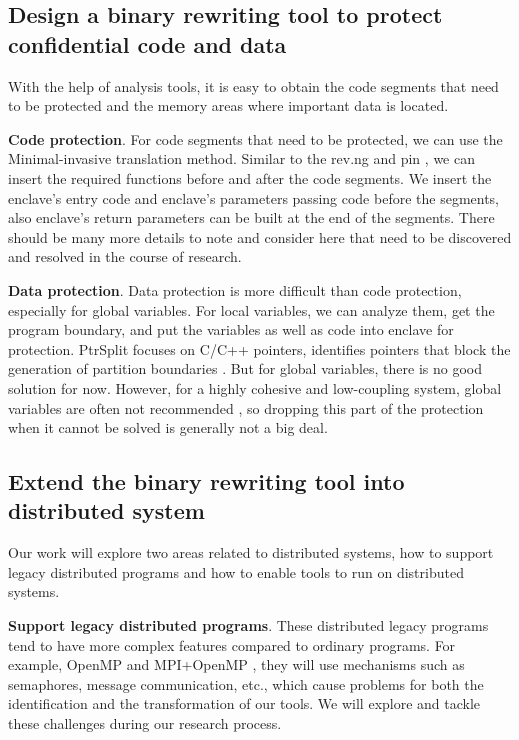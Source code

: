 \subsection{Design a binary rewriting tool to protect confidential code and data}
With the help of analysis tools, it is easy to obtain the code segments that need
to be protected and the memory areas where important data is located.

\textbf{Code protection}. For code segments that need to be protected,
we can use the Minimal-invasive translation method. Similar to the rev.ng \cite{Federico2017revngAU}
and pin \cite{Luk2005PinBC}, we can insert the required functions before and
after the code segments. We insert the enclave's entry code and enclave's parameters passing code
before the segments, also enclave's return parameters can be built at the end of the segments.
There should be many more details to note and consider here that need to be
discovered and resolved in the course of research.

\textbf{Data protection}. Data protection is more difficult than code protection,
especially for global variables.
For local variables, we can analyze them, get the program boundary,
and put the variables as well as code into enclave for protection.
PtrSplit focuses on C/C++ pointers, identifies pointers that block
the generation of partition boundaries \cite{Liu2017PtrSplitSG}.
But for global variables, there is no good solution for now. However,
for a highly cohesive and low-coupling system, global variables are often not recommended
\cite{GlobalVariablesAreBad},
so dropping this part of the protection when it cannot be solved is generally not a big deal. 

\subsection{Extend the binary rewriting tool into distributed system}
Our work will explore two areas related to distributed systems, how to support legacy distributed
programs and how to enable tools to run on distributed systems.

\textbf{Support legacy distributed programs}.
These distributed legacy programs tend to have more complex features
compared to ordinary programs.
For example, OpenMP \cite{Dagum1998OpenMPAI} and MPI+OpenMP \cite{Klinkenberg2020CHAMELEONRL},
they will use mechanisms such as semaphores, message communication, etc., which cause problems
for both the identification and the transformation of our tools.
We will explore and tackle these challenges during our research process.

